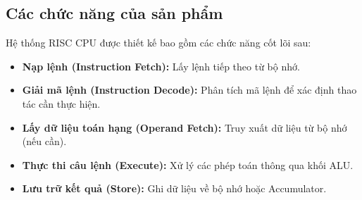 \subsection{Các chức năng của sản phẩm}
Hệ thống RISC CPU được thiết kế bao gồm các chức năng cốt lõi sau:
\begin{itemize}
    \item \textbf{Nạp lệnh (Instruction Fetch):} Lấy lệnh tiếp theo từ bộ nhớ.
    \item \textbf{Giải mã lệnh (Instruction Decode):} Phân tích mã lệnh để xác định thao tác cần thực hiện.
    \item \textbf{Lấy dữ liệu toán hạng (Operand Fetch):} Truy xuất dữ liệu từ bộ nhớ (nếu cần).
    \item \textbf{Thực thi câu lệnh (Execute):} Xử lý các phép toán thông qua khối ALU.
    \item \textbf{Lưu trữ kết quả (Store):} Ghi dữ liệu về bộ nhớ hoặc Accumulator.
\end{itemize}



